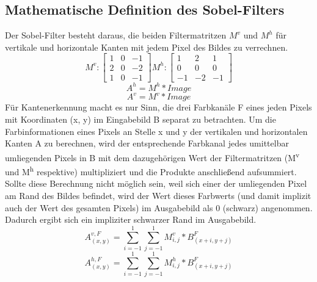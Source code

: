 \documentclass[course=erap]{aspdoc}
\begin{document}
\subsection{Mathematische Definition des Sobel-Filters}
\label{subsec:math-def}
Der Sobel-Filter besteht daraus, die beiden Filtermatritzen $M^{v}$ und $M^{h}$ für vertikale und horizontale Kanten mit jedem Pixel des Bildes zu verrechnen.
\begin{equation}
    M^{v} :
    \begin{bmatrix}
        1 & 0 & -1 \\
        2 & 0 & -2 \\
        1 & 0 & -1
    \end{bmatrix}
    M^{h} :
    \begin{bmatrix}
        1 & 2 & 1 \\
        0 & 0 & 0 \\
        -1 & -2 & -1
    \end{bmatrix}\label{eq:mvmh}
\end{equation}
\begin{equation}
    A^{h} = M^{h} * Image\label{eq:faltenhorizontal}
\end{equation}
\begin{equation}
    A^{v} = M^{v} * Image\label{eq:faltenvertikal}
\end{equation}
Für Kantenerkennung macht es nur Sinn, die drei Farbkanäle F eines jeden Pixels mit Koordinaten (x, y) im Eingabebild B separat zu betrachten.
Um die Farbinformationen eines Pixels an Stelle x und y der vertikalen und horizontalen Kanten A zu berechnen, wird der entsprechende Farbkanal jedes umittelbar umliegenden Pixels in B mit dem dazugehörigen Wert der Filtermatritzen (M\textsuperscript{v} und M\textsuperscript{h} respektive) multipliziert und die Produkte anschließend aufsummiert.
Sollte diese Berechnung nicht möglich sein, weil sich einer der umliegenden Pixel am Rand des Bildes befindet, wird der Wert dieses Farbwerts (und damit implizit auch der Wert des gesamten Pixels) im Ausgabebild als 0 (schwarz) angenommen.
Dadurch ergibt sich ein impliziter schwarzer Rand im Ausgabebild.
\begin{equation}
    A_(x,y)^{v,F} = \sum_{i=-1}^{1} \sum_{j=-1}^{1} M^{v}_{i,j} * B_{(x+i,y+j)}^{F}\label{eq:sumav}
\end{equation}
\begin{equation}
    A_(x,y)^{h,F} = \sum_{i=-1}^{1} \sum_{j=-1}^{1} M^{h}_{i,j} * B_{(x+i,y+j)}^{F}\label{eq:sumah}
\end{equation}
\end{document}
